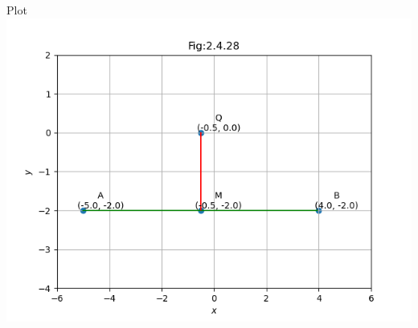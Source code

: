 \documentclass{beamer}
\begin{document}
\begin{frame}{Plot}
    \centering
    \includegraphics[width=\columnwidth, height=0.8\textheight, keepaspectratio]{figs/perpbisector1.png}   
\end{frame}
\end{document}
